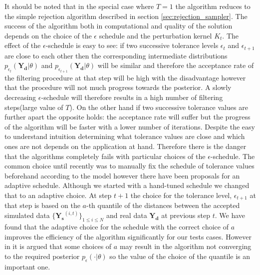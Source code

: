 \documentclass[12pt,a4paper,titlepage]{article}
\begin{document}
It should be noted that in the special case where $T=1$ the algorithm reduces to the simple rejection algorithm described in section \ref{sec:rejection_sampler}.  The success of the algorithm both in computational and quality of the solution depends on the choice of the $\epsilon$ schedule and the perturbation kernel $K_{t}$. The effect of the $\epsilon$-schedule is easy to see: if two successive tolerance levels $\epsilon_{t}$ and $\epsilon_{t+1}$ are close to each other then the corresponding intermediate distributions $p_{\epsilon_{t}}(\mathbf{Y_{d}}|\theta)$ and $p_{\epsilon_{t+1}}(\mathbf{Y_{d}}|\theta)$  will be similar and therefore the acceptance rate of the filtering procedure at that step will be high with the disadvantage however that the procedure will not much progress towards the posterior.  A slowly decreasing $\epsilon$-schedule will therefore results in a high number of filtering steps(large value of $T$). On the other hand if two successive tolerance values are further apart the opposite holds: the acceptance rate will suffer but the progress of the algorithm will be faster with a lower number of iterations. Despite the easy to understand intuition determining what tolerance values are close and which ones are not depends on the application at hand. Therefore there is the danger that the algorithms completely fails with particular choices of the $\epsilon$-schedule. The common choice until recently was to manually fix the schedule of tolerance values beforehand according to the model however there have been proposals for an adaptive schedule. Although we started with a hand-tuned schedule we changed that to an adaptive choice. At step $t+1$ the choice for the tolerance level, $\epsilon_{t+1}$ at that step is based on the $a$-th quantile of the distances between the accepted simulated data $\{\mathbf{Y_{s}}^{(i,t)}\}_{1 \le i \le N}$ and real data $\mathbf{Y_{d}}$ at previous step $t$. We have found that the adaptive choice for the schedule with the correct choice of $a$ improves the efficiency of the algorithm significantly for our tests cases. However in \cite{silk2012optimizing} it is argued that some choices of $a$ may result in the algorithm not converging to the required posterior $p_{\epsilon}(\cdot| \theta)$ so the value of the choice of the quantile is an important one.
\end{document}
